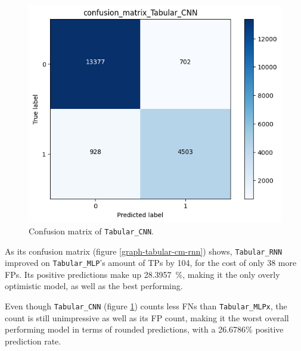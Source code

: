 \begin{figure}[!h]
\begin{minipage}{0.48\textwidth}
        \includegraphics[width=\linewidth]{obrazky-figures/Tabular_experiment/confusion_matrix_Tabular_CNN_2023-03-25_14:48:23.png}
        \caption{Confusion matrix of \texttt{Tabular\_CNN}.}
        \label{graph-tabular-cm-cnn}
    \end{minipage}\hfill
\end{figure}
As its confusion matrix (figure \ref{graph-tabular-cm-rnn}) shows, \texttt{Tabular\_RNN} improved
on \texttt{Tabular\_MLP}'s amount of TPs by 104, for the cost of only 38 more FPs.
Its positive predictions make up 28.3957~\%, making it the only overly optimistic model, as well as the best
performing.

Even though \texttt{Tabular\_CNN} (figure \ref{graph-tabular-cm-cnn}) counts less FNs than
\texttt{Tabular\_MLPx}, the count is still unimpressive as well as its FP count, making it the worst
overall performing model in terms of rounded predictions, with a 26.6786\% positive prediction rate.


